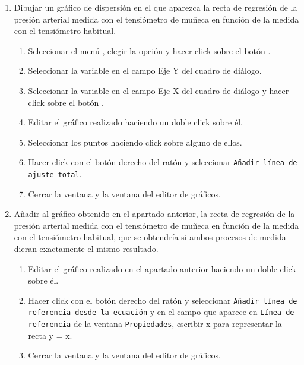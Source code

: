 \begin{enumerate}[leftmargin=*]
\begin{enumerate}
\item Dibujar un gráfico de dispersión en el que aparezca la recta de regresión de la presión arterial medida con el tensiómetro de muñeca
en función de la medida con el tensiómetro habitual.
\begin{indicacion}
\begin{enumerate}
\item Seleccionar el menú , elegir la opción  y hacer click sobre el botón .
\item Seleccionar la variable  en el campo Eje Y del cuadro de diálogo.
\item Seleccionar la variable  en el campo Eje X del cuadro de diálogo y hacer click sobre el botón .
\item Editar el gráfico realizado haciendo un doble click sobre él.
\item Seleccionar los puntos haciendo click sobre alguno de ellos.
\item Hacer click con el botón derecho del ratón y seleccionar \texttt{Añadir línea de ajuste total}.
\item Cerrar la ventana  y la ventana del editor de gráficos.
\end{enumerate}
\end{indicacion}


\item Añadir al gráfico obtenido en el apartado anterior, la recta de regresión de la presión arterial medida con el tensiómetro de muñeca en función de la medida con el tensiómetro habitual, que se obtendría si ambos procesos de medida dieran exactamente el mismo resultado.
\begin{indicacion}
\begin{enumerate}
\item Editar el gráfico realizado en el apartado anterior haciendo un doble click sobre él.
\item Hacer click con el botón derecho del ratón y seleccionar \texttt{Añadir línea de referencia desde la ecuación} y en el campo  que aparece en \texttt{Línea de referencia} de la ventana \texttt{Propiedades}, escribir x para representar la recta y = x.
\item Cerrar la ventana  y la ventana del editor de gráficos.
\end{enumerate}
\end{indicacion}


\end{enumerate}
\end{enumerate}
